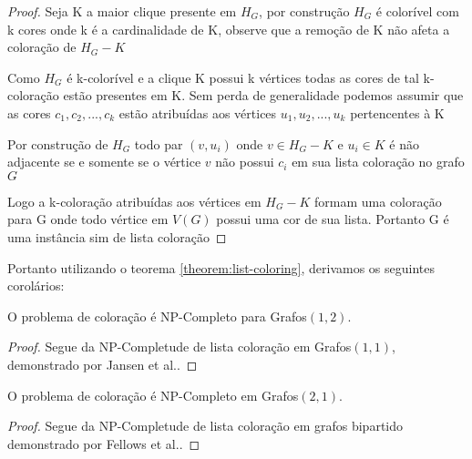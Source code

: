 \begin{proof}
	Seja K a maior clique presente em $H_G$, por construção $H_G$ é colorível com k cores onde k é a cardinalidade de K, observe que a remoção de K não afeta a coloração de $H_G - K$
	
	Como $H_G$ é k-colorível e a clique K possui k vértices todas as cores de tal k-coloração estão presentes em K. Sem perda de generalidade podemos assumir que as cores $c_1,c_2,...,c_k$ estão atribuídas aos vértices $u_1,u_2,...,u_k$ pertencentes à K
	
	Por construção de $H_G$ todo par $(v,u_i)$ onde $v \in H_G - K$ e $u_i \in K$ é não adjacente se e somente se o vértice $v$ não possui $c_i$ em sua lista coloração no grafo $G$
	
	Logo a k-coloração atribuídas aos vértices em $H_G - K$ formam uma coloração para G onde todo vértice em $V(G)$ possui uma cor de sua lista. Portanto G é uma instância sim de lista coloração
\end{proof}
Portanto utilizando o teorema \ref{theorem:list-coloring}, derivamos os seguintes corolários:
\begin{corolario}
	O problema de coloração é NP-Completo para Grafos$(1,2)$.
	\begin{proof}
		Segue da NP-Completude de lista coloração em Grafos$(1,1)$, demonstrado por Jansen et al.\cite{jansen1997}.
	\end{proof}
\end{corolario}
\begin{corolario}
	O problema de coloração é NP-Completo em Grafos$(2,1)$.
	\begin{proof}
		Segue da NP-Completude de lista coloração em grafos bipartido demonstrado por Fellows et al.\cite{fellows07}.
	\end{proof}
\end{corolario}    
